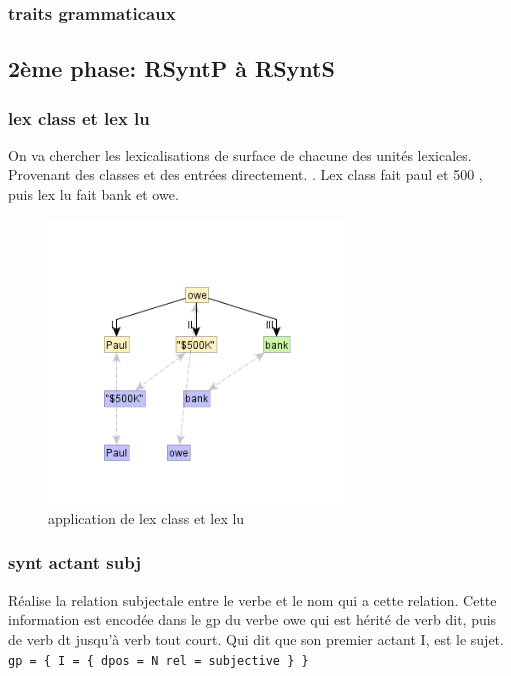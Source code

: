 \subsubsection{traits grammaticaux}


\subsection{2ème phase: RSyntP à RSyntS}

\subsubsection{lex class et lex lu}
On va chercher les lexicalisations de surface de chacune des unités lexicales. Provenant des classes et des entrées directement. . Lex class fait paul et 500 , puis lex lu fait bank et owe.
\begin{figure}[htb]
	\centering
	\includegraphics[width=0.7\textwidth, trim = {0cm 0cm 0cm 0cm},clip]{ch3/figs/rsyntslexicalisation1.png}
	\caption{application de lex class et lex lu}
	\label{fig:lexsurf}
\end{figure}

\subsubsection{synt actant subj}
Réalise la relation subjectale entre le verbe et le nom qui a cette relation. Cette information est encodée dans le gp du verbe owe qui est hérité de verb dit, puis de verb dt jusqu'à verb tout court. Qui dit que son premier actant I, est le sujet. \lstinline!gp = { I = { dpos = N rel = subjective } } !

